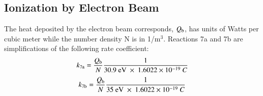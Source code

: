 \documentclass{warpdoc}
\begin{document}
\subsection{Ionization by Electron Beam}

 The heat deposited by the electron beam  corresponds, $Q_{\rm b}$, has units of Watts per cubic meter while the number density N is in 1/m$^3$. Reactions 7a and 7b are simplifications of the following rate coefficient:
%
\begin{equation}
  k_{\rm 7a}=\frac{Q_{\rm b}}{N} \frac{1}{30.9 {\rm ~eV} ~\times~ 1.6022 \times 10^{-19}~C}
\end{equation}
%
%
\begin{equation}
  k_{\rm 7b}=\frac{Q_{\rm b}}{N} \frac{1}{35 {\rm ~eV} ~\times~ 1.6022 \times 10^{-19}~C}
\end{equation}
%









\end{document}
